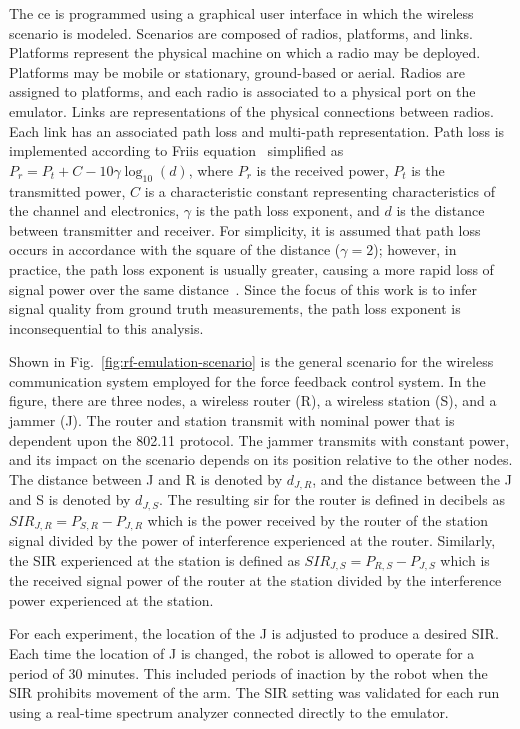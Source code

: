 The \gls{ce} is programmed using a graphical user interface in which the wireless scenario is modeled.  Scenarios are composed of radios, platforms, and links.  Platforms represent the physical machine on which a radio may be deployed.  Platforms may be mobile or stationary, ground-based or aerial. Radios are assigned to platforms, and each radio is associated to a physical port on the emulator.  Links are representations of the physical connections between radios.  Each link has an associated path loss and multi-path representation.  Path loss is implemented according to Friis equation~\cite{Shaw2013.Frii} simplified as 
$P_r = P_t + C - 10\gamma\log_{10}\left( d \right)$, 
where $P_r$ is the received power, $P_t$ is the transmitted power, $C$ is a characteristic constant representing characteristics of the channel and electronics, $\gamma$ is the path loss exponent, and $d$ is the distance between transmitter and receiver.  For simplicity, it is assumed that path loss occurs in accordance with the square of the distance ($\gamma=2$); however, in practice, the path loss exponent is usually greater, causing a more rapid loss of signal power over the same distance~\cite{Candell2017.NIST1951}.  Since the focus of this work is to infer signal quality from ground truth measurements, the path loss exponent is inconsequential to this analysis.


Shown in Fig.~\ref{fig:rf-emulation-scenario} is the general scenario for the wireless communication system employed for the force feedback control system.  In the figure, there are three nodes, a wireless router (R), a wireless station (S), and a jammer (J).  The router and station transmit with nominal power that is dependent upon the 802.11 protocol. The jammer transmits with constant power, and its impact on the scenario depends on its position relative to the other nodes.  The distance between J and R is denoted by $d_{J,R}$, and the distance between the J and S is denoted by $d_{J,S}$.  The resulting \gls{sir} for the router is defined in decibels as $SIR_{J,R} = P_{S,R}-P_{J,R}$ which is the power received by the router of the station signal divided by the power of interference experienced at the router.  Similarly, the SIR experienced at the station is defined as $SIR_{J,S} = P_{R,S}-P_{J,S}$ which is the received signal power of the router at the station divided by the interference power experienced at the station.

For each experiment, the location of the J is adjusted to produce a desired SIR.  Each time the location of J is changed, the robot is allowed to operate for a period of 30 minutes.  This included periods of inaction by the robot when the SIR prohibits movement of the arm.  The SIR setting was validated for each run using a real-time spectrum analyzer connected directly to the emulator.

	
	
	
	
	



